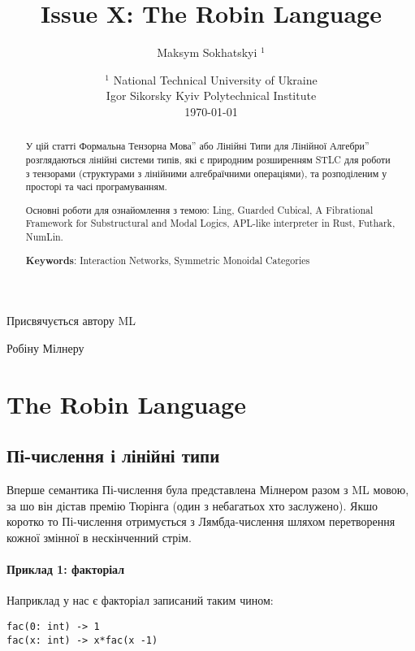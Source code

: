 \documentclass{article}
\begin{document}
\title{Issue X: The Robin Language}
\author{Maksym Sokhatskyi $^1$}
\date{ $^1$ National Technical University of Ukraine \\
       \small Igor Sikorsky Kyiv Polytechnical Institute \\
       \today }

\maketitle

\begin{abstract}

У цій статті Формальна Тензорна Мова'' або Лінійні Типи для Лінійної Алгебри''
розглядаються лінійні системи типів,
які є природним розширенням STLC для роботи з тензорами (структурами з лінійними алгебраїчними операціями),
та розподіленим у просторі та часі програмуванням.

Основні роботи для ознайомлення з темою: Ling, Guarded Cubical,
A Fibrational Framework for Substructural and Modal Logics,
APL-like interpreter in Rust, Futhark, NumLin.

{\bf Keywords}: Interaction Networks, Symmetric Monoidal Categories
\end{abstract}

\ifincludeTOC
  \tableofcontents
\fi

\newpage

\epigraph{Присвячується автору ML}{Робіну Мілнеру}

\section{The Robin Language}

\subsection{Пі-числення і лінійні типи}
Вперше семантика Пі-числення була представлена Мілнером разом з ML мовою,
за шо він дістав премію Тюрінга (один з небагатьох хто заслужено).
Якшо коротко то Пі-числення отримується з Лямбда-числення шляхом перетворення
кожної змінної в нескінченний стрім.

\paragraph{Приклад 1: факторіал}
Наприклад у нас є факторіал записаний таким чином:
\begin{lstlisting}
fac(0: int) -> 1
fac(x: int) -> x*fac(x -1)
\end{lstlisting}
\end{document}
